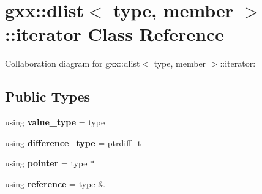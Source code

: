 \hypertarget{classgxx_1_1dlist_1_1iterator}{}\section{gxx\+:\+:dlist$<$ type, member $>$\+:\+:iterator Class Reference}
\label{classgxx_1_1dlist_1_1iterator}


Collaboration diagram for gxx\+:\+:dlist$<$ type, member $>$\+:\+:iterator\+:
\subsection*{Public Types}
\begin{DoxyCompactItemize}
\item 
using {\bfseries value\+\_\+type} = type\hypertarget{classgxx_1_1dlist_1_1iterator_a09ac3d631bbfb446c7b3292e37ab92c5}{}\label{classgxx_1_1dlist_1_1iterator_a09ac3d631bbfb446c7b3292e37ab92c5}

\item 
using {\bfseries difference\+\_\+type} = ptrdiff\+\_\+t\hypertarget{classgxx_1_1dlist_1_1iterator_a4ac457be7db578c62726fdec02f7f052}{}\label{classgxx_1_1dlist_1_1iterator_a4ac457be7db578c62726fdec02f7f052}

\item 
using {\bfseries pointer} = type $\ast$\hypertarget{classgxx_1_1dlist_1_1iterator_a3158ccd3585b790ff9708ab53a93a03e}{}\label{classgxx_1_1dlist_1_1iterator_a3158ccd3585b790ff9708ab53a93a03e}

\item 
using {\bfseries reference} = type \&\hypertarget{classgxx_1_1dlist_1_1iterator_a18efa1e6446e7523d84196aa906fc19d}{}\label{classgxx_1_1dlist_1_1iterator_a18efa1e6446e7523d84196aa906fc19d}

\end{DoxyCompactItemize}
